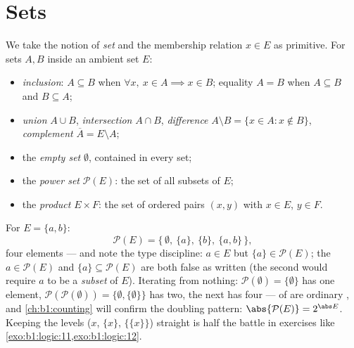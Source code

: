 \section{Sets}

\begin{definition}\label{def:b1:logic:sets}
We take the notion of \emph{set} and the membership relation
$x \in E$ as primitive. For sets $A, B$ inside an ambient set $E$:
\begin{itemize}
  \item \emph{inclusion}: $A \subseteq B$ when $\forall x,\ x \in A
        \implies x \in B$; equality $A = B$ when $A \subseteq B$ and
        $B \subseteq A$;
  \item \emph{union} $A \cup B$, \emph{intersection} $A \cap B$,
        \emph{difference} $A \setminus B = \{x \in A : x \notin B\}$,
        \emph{complement} $\overline{A} = E \setminus A$;
  \item the \emph{empty set} $\emptyset$, contained in every set;
  \item the \emph{power set} $\mathcal{P}(E)$: the set
        of all subsets of $E$;
  \item the \emph{product} $E \times F$: the set of ordered pairs
        $(x, y)$ with $x \in E$, $y \in F$.
\end{itemize}
\end{definition}

\begin{example}\label{ex:b1:logic:powerset}
For $E = \{a, b\}$:
\[
\mathcal P(E) = \bigl\{\, \emptyset,\ \{a\},\ \{b\},\ \{a, b\}
\,\bigr\},
\]
four elements --- and note the type discipline: $a \in E$ but
$\{a\} \in \mathcal P(E)$; the  $a \in \mathcal P(E)$
and $\{a\} \subseteq \mathcal P(E)$ are both false as written
(the second would require $a$ to be a \emph{subset} of $E$).
Iterating from nothing: $\mathcal P(\emptyset) = \{\emptyset\}$
has one element, $\mathcal P(\mathcal P(\emptyset)) = \{\emptyset,
\{\emptyset\}\}$ has two, the next has four ---  of  are
ordinary , and \cref{ch:b1:counting} will confirm the doubling
pattern: $\abs{\mathcal P(E)} = 2^{\abs E}$. Keeping the levels
($x$, $\{x\}$, $\{\{x\}\}$) straight is half the battle in
exercises like \cref{exo:b1:logic:11,exo:b1:logic:12}.
\end{example}

